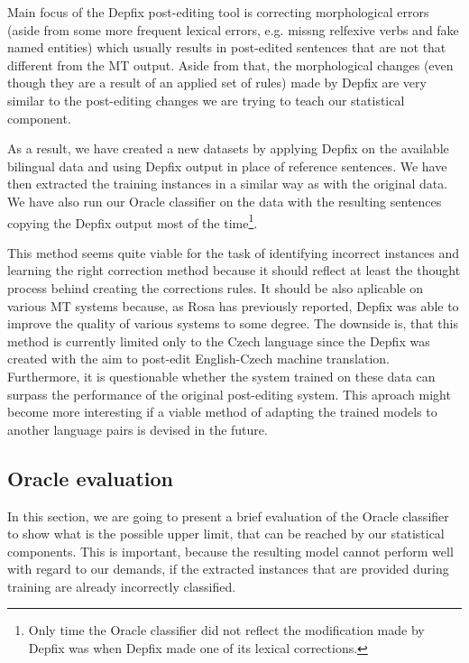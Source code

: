 Main focus of the Depfix post-editing tool is correcting morphological errors (aside from some more
frequent lexical errors, e.g. missng relfexive verbs and fake named entities) which usually 
results in post-edited sentences that are not that different from the MT output. Aside from that,
the morphological changes (even though they are a result of an applied set of rules) made
by Depfix are very similar to the post-editing changes we are trying to teach our statistical component.

As a result, we have created a new datasets by applying Depfix on the available bilingual data and
using Depfix output in place of reference sentences. We have then extracted the training instances in a
similar way as with the original data. We have also run our Oracle classifier on the data with
the resulting sentences copying the Depfix output most of the time\footnote{Only time the Oracle classifier
did not reflect the modification made by Depfix was when Depfix made one of its lexical corrections.}.

This method seems quite viable for the task of identifying incorrect instances and learning the
right correction method because it should reflect at least the thought process behind creating the corrections rules.
It should be also aplicable on various MT systems because, as Rosa has
previously reported, Depfix was able to improve the quality of various systems to some degree.
The downside is, that this method is currently limited only to the Czech language since the Depfix was
created with the aim to post-edit English-Czech machine translation.
Furthermore, it is questionable whether the system trained on these data can surpass the performance
of the original post-editing system. 
This aproach might become more interesting if a viable method of adapting the trained models
to another language pairs is devised in the future.

\subsection{Oracle evaluation}

In this section, we are going to present a brief evaluation of the Oracle classifier to show
what is the possible upper limit, that can be reached by our statistical components. This is
important, because the resulting model cannot perform well with regard to our demands, if the extracted
instances that are provided during training are already incorrectly classified.

